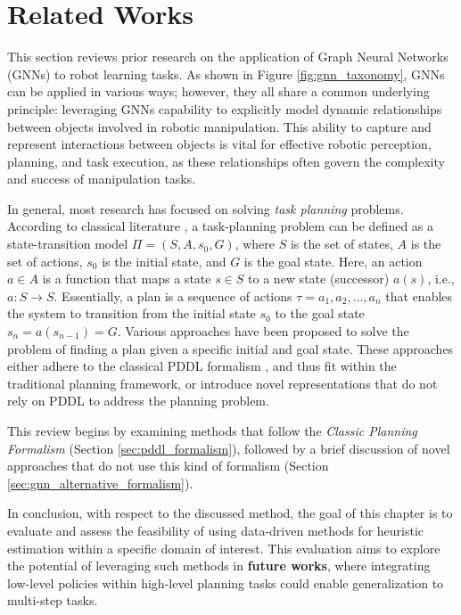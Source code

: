 \section{Related Works}
\label{sec:gnn_related_works}
This section reviews prior research on the application of Graph Neural Networks (GNNs) to robot learning tasks. As shown in Figure \ref{fig:gnn_taxonomy}, GNNs can be applied in various ways; however, they all share a common underlying principle: leveraging GNNs capability to explicitly model dynamic relationships between objects involved in robotic manipulation. This ability to capture and represent interactions between objects is vital for effective robotic perception, planning, and task execution, as these relationships often govern the complexity and success of manipulation tasks.




In general, most research has focused on solving \textit{task planning} problems. According to classical literature \cite{geffner2013concise}, a task-planning problem can be defined as a state-transition model $\Pi = \left( S, A, s_{0}, G \right)$, where $S$ is the set of states, $A$ is the set of actions, $s_{0}$ is the initial state, and $G$ is the goal state. Here, an action $a \in A$ is a function that maps a state $s \in S$ to a new state (successor) $a(s)$, i.e., $a: S \rightarrow S$. Essentially, a plan is a sequence of actions $\tau = a_{1}, a_{2}, \dots, a_{n}$ that enables the system to transition from the initial state $s_{0}$ to the goal state $s_{n} = a(s_{n-1}) = G$. Various approaches have been proposed to solve the problem of finding a plan given a specific initial and goal state. These approaches either adhere to the classical PDDL formalism \cite{aeronautiques1998pddl}, and thus fit within the traditional planning framework, or introduce novel representations that do not rely on PDDL to address the planning problem.

This review begins by examining methods that follow the \textit{Classic Planning Formalism}  (Section \ref{sec:pddl_formalism}), followed by a brief discussion of novel approaches that do not use this kind of formalism (Section \ref{sec:gnn_alternative_formalism}).




In conclusion, with respect to the discussed method, the goal of this chapter is to evaluate and assess the feasibility of using data-driven methods for heuristic estimation within a specific domain of interest. This evaluation aims to explore the potential of leveraging such methods in \textbf{future works}, where integrating low-level policies within high-level planning tasks could enable generalization to multi-step tasks.
